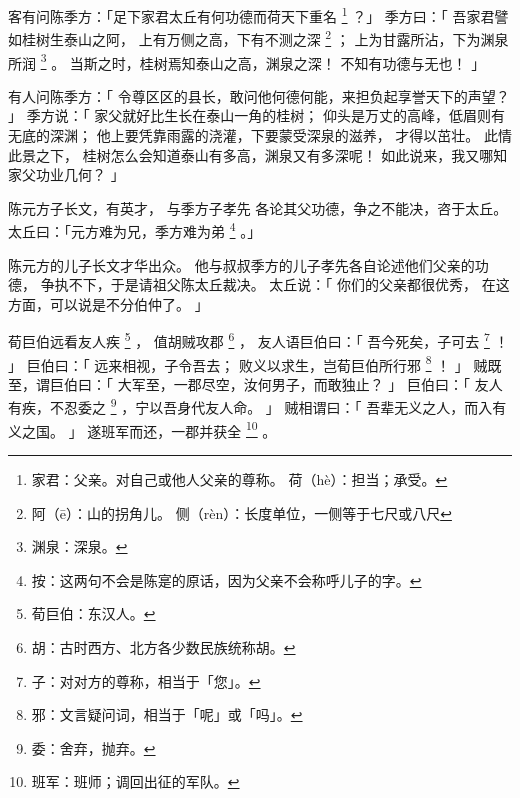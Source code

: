 \begin{paracol}{2}
\switchcolumn*[\section{}]

客有问陈季方：「足下家君太丘有何功德而荷天下重名%
\footnote{%
    家君：父亲。对自己或他人父亲的尊称。
    荷（hè）：担当；承受。
}%
？」
季方曰：「
    吾家君譬如桂树生泰山之阿，
    上有万侧之高，下有不测之深%
    \footnote{%
        阿（ē）：山的拐角儿。
        侧（rèn）：长度单位，一侧等于七尺或八尺
    }%
    ；
    上为甘露所沾，下为渊泉所润%
    \footnote{%
        渊泉：深泉。
    }%
    。
    当斯之时，桂树焉知泰山之高，渊泉之深！
    不知有功德与无也！
」

\switchcolumn

有人问陈季方：「
    令尊区区的县长，敢问他何德何能，来担负起享誉天下的声望？
」
季方说：「
    家父就好比生长在泰山一角的桂树；
    仰头是万丈的高峰，低眉则有无底的深渊；
    他上要凭靠雨露的浇灌，下要蒙受深泉的滋养，
    才得以茁壮。
    此情此景之下，
    桂树怎么会知道泰山有多高，渊泉又有多深呢！
    如此说来，我又哪知家父功业几何？
」


\switchcolumn*[\section{}]

陈元方子长文，有英才，
与季方子孝先
各论其父功德，争之不能决，咨于太丘。
太丘曰：「元方难为兄，季方难为弟%
\footnote{%
    按：这两句不会是陈寔的原话，因为父亲不会称呼儿子的字。
}%
。」

\switchcolumn

陈元方的儿子长文才华出众。
他与叔叔季方的儿子孝先各自论述他们父亲的功德，
争执不下，于是请祖父陈太丘裁决。
太丘说：「
    你们的父亲都很优秀，
    在这方面，可以说是不分伯仲了。
」


\switchcolumn*[\section{}]

荀巨伯远看友人疾%
\footnote{%
    荀巨伯：东汉人。
}%
，
值胡贼攻郡%
\footnote{%
    胡：古时西方、北方各少数民族统称胡。
}%
，
友人语巨伯曰：「
    吾今死矣，子可去%
    \footnote{%
        子：对对方的尊称，相当于「您」。
    }%
    ！
」
巨伯曰：「
    远来相视，子令吾去；
    败义以求生，岂荀巨伯所行邪%
    \footnote{%
        邪：文言疑问词，相当于「呢」或「吗」。
    }%
    ！
」
贼既至，谓巨伯曰：「
    大军至，一郡尽空，汝何男子，而敢独止？
」
巨伯曰：「
    友人有疾，不忍委之%
    \footnote{%
        委：舍弃，抛弃。
    }%
    ，宁以吾身代友人命。
」
贼相谓曰：「
    吾辈无义之人，而入有义之国。
」
遂班军而还，一郡并获全%
\footnote{%
    班军：班师；调回出征的军队。
}%
。


\end{paracol}

